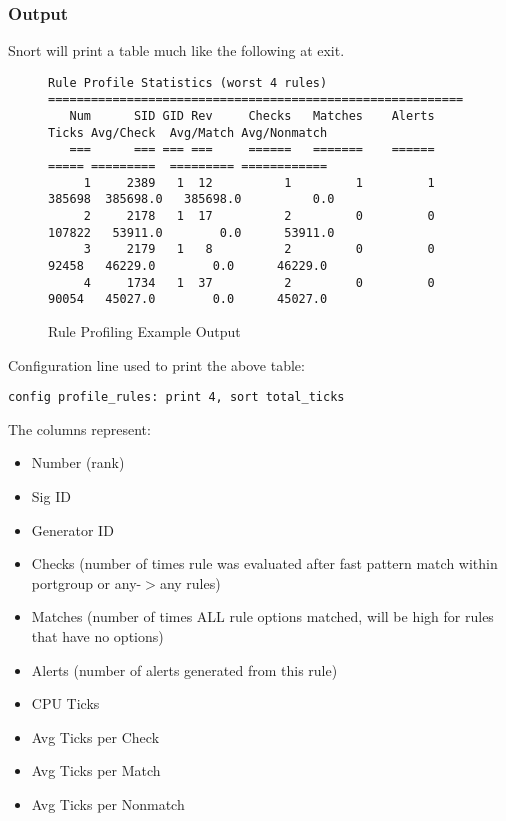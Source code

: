 \documentclass[english]{report}
\begin{document}
\subsubsection{Output}

Snort will print a table much like the following at exit.  

\begin{figure}
\footnotesize{
\begin{verbatim}
Rule Profile Statistics (worst 4 rules)
==========================================================
   Num      SID GID Rev     Checks   Matches    Alerts               Ticks Avg/Check  Avg/Match Avg/Nonmatch
   ===      === === ===     ======   =======    ======               ===== =========  ========= ============
     1     2389   1  12          1         1         1              385698  385698.0   385698.0          0.0
     2     2178   1  17          2         0         0              107822   53911.0        0.0      53911.0
     3     2179   1   8          2         0         0               92458   46229.0        0.0      46229.0
     4     1734   1  37          2         0         0               90054   45027.0        0.0      45027.0
\end{verbatim}
}
\caption{\label{rule profiling example output}Rule Profiling Example Output}
\end{figure}

Configuration line used to print the above table: 

\subitem \texttt{config profile\_rules: print 4, sort total\_ticks}

The columns represent:

\begin{itemize}
\item Number (rank)
\item Sig ID
\item Generator ID
\item Checks (number of times rule was evaluated after fast pattern match
  within portgroup or any-$>$any rules)
\item Matches (number of times ALL rule options matched, will be high for
  rules that have no options)
\item Alerts (number of alerts generated from this rule)
\item CPU Ticks 
\item Avg Ticks per Check
\item Avg Ticks per Match
\item Avg Ticks per Nonmatch
\end{itemize}
\end{document}
